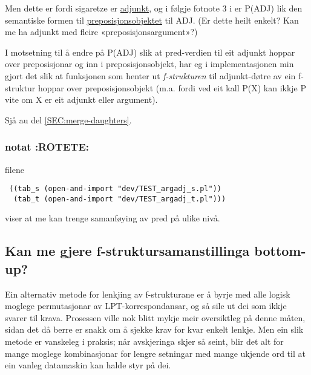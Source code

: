 \documentclass[11pt,a4paper,oneside,draft]{book}
\begin{document}
Men dette er fordi sigaretze er \underline{adjunkt}, og i følgje fotnote 3 i
\citet{dyvik2009lmp} er P(ADJ) lik den semantiske formen til
\underline{preposisjonsobjektet} til ADJ. (Er dette heilt enkelt? Kan me ha
adjunkt med fleire «preposisjonsargument»?)

I motsetning til å endre på P(ADJ) slik at pred-verdien til eit
adjunkt hoppar over preposisjonar og inn i preposisjonsobjekt, har eg
i implementasjonen min gjort det slik at funksjonen som henter ut \emph{f-strukturen} til adjunkt-døtre av ein f-struktur hoppar over
preposisjonsobjekt (m.a. fordi ved eit kall P(X) kan ikkje P vite om X
er eit adjunkt eller argument).

Sjå au del \ref{SEC:merge-daughters}.

\subsubsection{notat \textbf{:ROTETE:}}
\label{sec-4.1.2.3}

filene 
\begin{verbatim}
 ((tab_s (open-and-import "dev/TEST_argadj_s.pl"))
  (tab_t (open-and-import "dev/TEST_argadj_t.pl")))
\end{verbatim}

viser at me kan trenge samanføying av pred på ulike nivå.
\subsection{Kan me gjere f-struktursamanstillinga bottom-up?}
\label{sec-4.1.3}

Ein alternativ metode for lenkjing av f-strukturane er å byrje med
alle logisk moglege permutasjonar av LPT-korrespondansar, og så sile
ut dei som ikkje svarer til krava. Prosessen ville nok blitt mykje
meir oversiktleg på denne måten, sidan det då berre er snakk om å
sjekke krav for kvar enkelt lenkje.  Men ein slik metode er vanskeleg
i praksis; når avskjeringa skjer så seint, blir det alt for mange
moglege kombinasjonar for lengre setningar med mange ukjende ord til
at ein vanleg datamaskin kan halde styr på dei.
\end{document}
